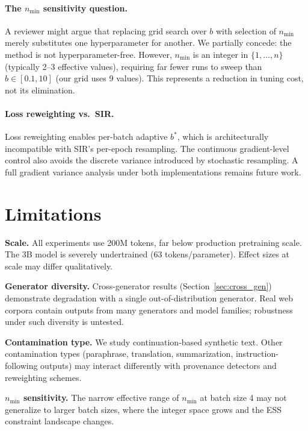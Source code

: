 \documentclass[11pt]{article}
\begin{document}
\paragraph{The $n_{\min}$ sensitivity question.}
A reviewer might argue that replacing grid search over $b$ with selection of $n_{\min}$ merely substitutes one hyperparameter for another.
We partially concede: the method is not hyperparameter-free.
However, $n_{\min}$ is an integer in $\{1, \ldots, n\}$ (typically 2--3 effective values), requiring far fewer runs to sweep than $b \in [0.1, 10]$ (our grid uses 9 values).
This represents a reduction in tuning cost, not its elimination.

\paragraph{Loss reweighting vs.\ SIR.}
Loss reweighting enables per-batch adaptive $b^*$, which is architecturally incompatible with SIR's per-epoch resampling.
The continuous gradient-level control also avoids the discrete variance introduced by stochastic resampling.
A full gradient variance analysis under both implementations remains future work.

\section{Limitations}
\label{sec:limitations}

\textbf{Scale.}
All experiments use 200M tokens, far below production pretraining scale.
The 3B model is severely undertrained (63 tokens/parameter).
Effect sizes at scale may differ qualitatively.

\textbf{Generator diversity.}
Cross-generator results (Section~\ref{sec:cross_gen}) demonstrate degradation with a single out-of-distribution generator.
Real web corpora contain outputs from many generators and model families; robustness under such diversity is untested.

\textbf{Contamination type.}
We study continuation-based synthetic text.
Other contamination types (paraphrase, translation, summarization, instruction-following outputs) may interact differently with provenance detectors and reweighting schemes.

\textbf{$n_{\min}$ sensitivity.}
The narrow effective range of $n_{\min}$ at batch size 4 may not generalize to larger batch sizes, where the integer space grows and the ESS constraint landscape changes.
\end{document}
